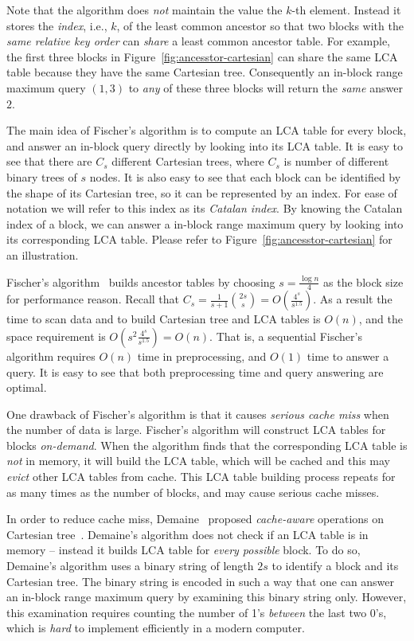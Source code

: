 Note that the algorithm does {\em not} maintain the value the $k$-th
element.  Instead it stores the {\em index}, i.e., $k$, of the least
common ancestor so that two blocks with the {\em same relative key
  order} can {\em share} a least common ancestor table.  For example,
the first three blocks in Figure~\ref{fig:ancesstor-cartesian} can
share the same LCA table because they have the same Cartesian tree.
Consequently an in-block range maximum query $(1, 3)$ to {\em any} of
these three blocks will return the {\em same} answer $2$.

The main idea of Fischer's algorithm is to compute an LCA table for
every block, and answer an in-block query directly by looking into its
LCA table.  It is easy to see that there are $C_s$ different Cartesian
trees, where $C_s$ is number of different binary trees of $s$ nodes.
It is also easy to see that each block can be identified by the shape
of its Cartesian tree, so it can be represented by an index.  For ease
of notation we will refer to this index as its {\em Catalan index}.
By knowing the Catalan index of a block, we can answer a in-block
range maximum query by looking into its corresponding LCA table.
Please refer to Figure~\ref{fig:ancesstor-cartesian} for an
illustration.

Fischer's algorithm~\cite{Fischer2006TheoreticalAP} builds ancestor
tables by choosing $s = \frac{\log n}{4}$ as the block size for
performance reason.  Recall that $C_s = \frac{1}{s+1}\binom{2s}{s} =
O(\frac{4^s}{s^{1.5}})$.  As a result the time to scan data and to
build Cartesian tree and LCA tables is $O(n)$, and the space
requirement is $O(s^2 \frac{4^s}{s^{1.5}}) = O(n)$.  That is, a
sequential Fischer's algorithm requires $O(n)$ time in preprocessing,
and $O(1)$ time to answer a query.  It is easy to see that both
preprocessing time and query answering are optimal.

One drawback of Fischer's algorithm is that it causes {\em serious
  cache miss} when the number of data is large.  Fischer's algorithm
will construct LCA tables for blocks {\em on-demand}.  When the
algorithm finds that the corresponding LCA table is {\em not} in
memory, it will build the LCA table, which will be cached and this may
{\em evict} other LCA tables from cache.  This LCA table building
process repeats for as many times as the number of blocks, and may
cause serious cache misses.

In order to reduce cache miss, Demaine~\cite{Demaine2009OnCT} proposed
{\em cache-aware} operations on Cartesian
tree~\cite{Vuillemin1980AUL}.  Demaine's algorithm does not check if
an LCA table is in memory -- instead it builds LCA table for {\em
  every possible} block.  To do so, Demaine's algorithm uses a binary
string of length $2s$ to identify a block and its Cartesian tree.  The
binary string is encoded in such a way that one can answer an in-block
range maximum query by examining this binary string only.  However,
this examination requires counting the number of 1's {\em between} the
last two 0's, which is {\em hard} to implement efficiently in a modern
computer.

